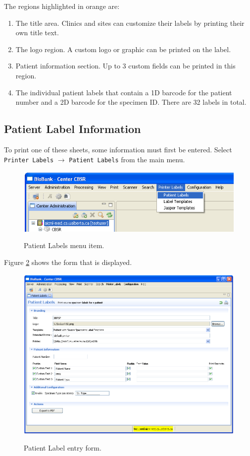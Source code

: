 The regions highlighted in orange are:
\begin{enumerate}
  \item The title area. Clinics and sites can customize their labels by
    printing their own title text.
  \item The logo region. A custom logo or graphic can be printed on the label.
  \item Patient information section. Up to 3 custom fields can be printed in
    this region.
  \item The individual patient labels that contain a 1D barcode for the patient
    number and a 2D barcode for the specimen ID. There are 32 labels in total.
\end{enumerate}

\subsection{Patient Label Information}

To print one of these sheets, some information must first be entered. Select
\texttt{Printer Labels} $\to$ \texttt{Patient Labels} from the main menu.

\begin{figure}[H]
  \centering
  \scalebox{0.35}
	   { \includegraphics*{screenshots/printer_labels/02_patient_labels_menu_item} }
	   \caption{Patient Labels menu item.}
	   \label{fig:patient_labels_menu_item}
\end{figure}

Figure \ref{fig:patient_label_form} shows the form that is displayed.

\begin{figure}[H]
  \centering
  \scalebox{0.45}
	   { \includegraphics*{screenshots/printer_labels/03_patient_label_form} }
	   \caption{Patient Label entry form.}
	   \label{fig:patient_label_form}
\end{figure}

